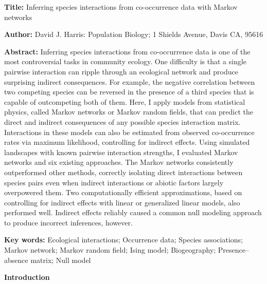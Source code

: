 \documentclass[12pt,]{article}
\date{}
\begin{document}
\begin{spacing}{1.9}
\begin{flushleft}
\renewcommand{\headrulewidth}{0pt}

\setlength{\parskip}{1pt}

\textbf{Title:} Inferring species interactions from co-occurrence data
with Markov networks

\textbf{Author:} David J. Harris: Population Biology; 1 Shields Avenue,
Davis CA, 95616

\textbf{Abstract:} Inferring species interactions from co-occurrence
data is one of the most controversial tasks in community ecology. One
difficulty is that a single pairwise interaction can ripple through an
ecological network and produce surprising indirect consequences. For
example, the negative correlation between two competing species can be
reversed in the presence of a third species that is capable of
outcompeting both of them. Here, I apply models from statistical
physics, called Markov networks or Markov random fields, that can
predict the direct and indirect consequences of any possible species
interaction matrix. Interactions in these models can also be estimated
from observed co-occurrence rates via maximum likelihood, controlling
for indirect effects. Using simulated landscapes with known pairwise
interaction strengths, I evaluated Markov networks and six existing
approaches. The Markov networks consistently outperformed other methods,
correctly isolating direct interactions between species pairs even when
indirect interactions or abiotic factors largely overpowered them. Two
computationally efficient approximations, based on controlling for
indirect effects with linear or generalized linear models, also
performed well. Indirect effects reliably caused a common null modeling
approach to produce incorrect inferences, however.

\textbf{Key words:} Ecological interactions; Occurrence data; Species
associations; Markov network; Markov random field; Ising model;
Biogeography; Presence--absence matrix; Null model

\noindent\textbf{Introduction}

\setlength{\parindent}{2em}


\end{flushleft}
\end{spacing}
\end{document}

